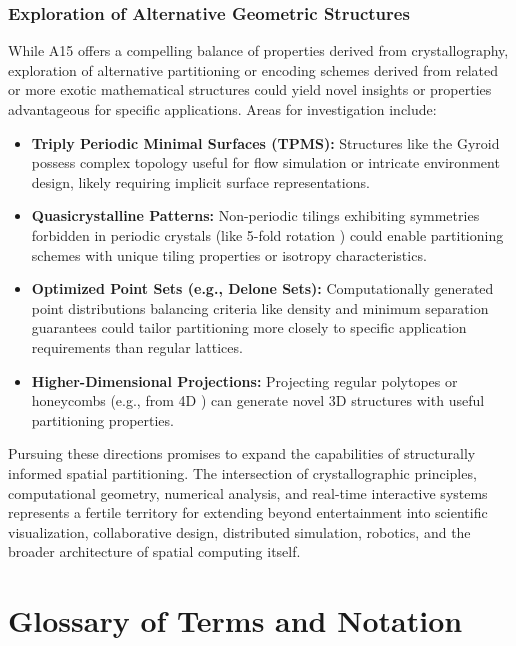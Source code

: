 \documentclass[10pt]{article}
\begin{document}
\subsubsection{Exploration of Alternative Geometric Structures}\label{subsubsec-outlook-geometry}
While A15 offers a compelling balance of properties derived from crystallography, exploration of alternative partitioning or encoding schemes derived from related or more exotic mathematical structures could yield novel insights or properties advantageous for specific applications. Areas for investigation include:
\begin{itemize} \itemsep0pt
    \item \textbf{Triply Periodic Minimal Surfaces (TPMS):} Structures like the Gyroid \cite{Schoen1970} possess complex topology useful for flow simulation or intricate environment design, likely requiring implicit surface representations.
    \item \textbf{Quasicrystalline Patterns:} Non-periodic tilings exhibiting symmetries forbidden in periodic crystals (like 5-fold rotation \cite{Shechtman1984}) could enable partitioning schemes with unique tiling properties or isotropy characteristics.
    \item \textbf{Optimized Point Sets (e.g., Delone Sets):} Computationally generated point distributions balancing criteria like density and minimum separation guarantees \cite{Gruber2007} could tailor partitioning more closely to specific application requirements than regular lattices.
    \item \textbf{Higher-Dimensional Projections:} Projecting regular polytopes or honeycombs (e.g., from 4D \cite{Coxeter1973}) can generate novel 3D structures with useful partitioning properties.
\end{itemize}

Pursuing these directions promises to expand the capabilities of structurally informed spatial partitioning. The intersection of crystallographic principles, computational geometry, numerical analysis, and real-time interactive systems represents a fertile territory for extending beyond entertainment into scientific visualization, collaborative design, distributed simulation, robotics, and the broader architecture of spatial computing itself.

\section{Glossary of Terms and Notation}
\label{sec-glossary}
\end{document}
